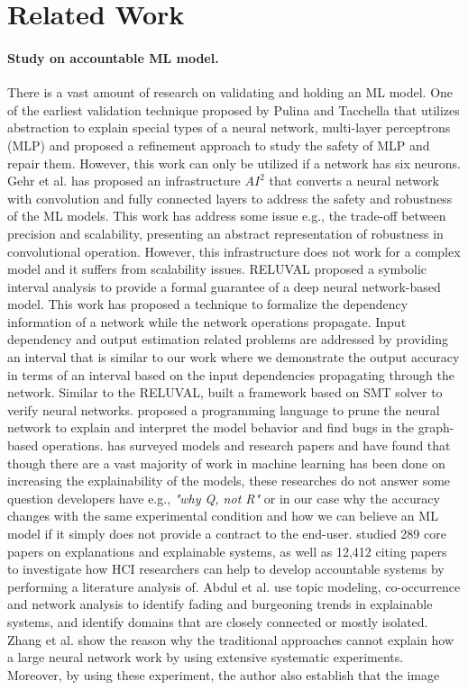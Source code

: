 \section{Related Work}
\label{sec:relatedwork}
\paragraph{\textbf{Study on accountable ML model.}}
There is a vast amount of research on validating and holding an ML model. One of the earliest validation technique proposed by Pulina and Tacchella \cite{pulina2010abstraction} that utilizes abstraction to explain special types of a neural network, multi-layer perceptrons (MLP) and proposed a refinement approach to study the safety of MLP and repair them. However, this work can only be utilized if a network has six neurons. Gehr et al. \cite{gehr2018ai2} has proposed an infrastructure $AI^{2}$ that converts a neural network with convolution and fully connected layers to address the safety and robustness of the ML models. This work has address some issue e.g., the trade-off between precision and scalability, presenting an abstract representation of robustness in convolutional operation. However, this infrastructure does not work for a complex model and it suffers from scalability issues. RELUVAL \cite{wang2018formal} proposed a symbolic interval analysis to provide a formal guarantee of a deep neural network-based model. This work has proposed a technique to formalize the dependency information of a network while the network operations propagate. Input dependency and output estimation related problems are addressed by providing an interval that is similar to our work where we demonstrate the output accuracy in terms of an interval based on the input dependencies propagating through the network. Similar to the RELUVAL, \cite{katz2017reluplex} built a framework based on SMT solver to verify neural networks. \cite{jia2019taso} proposed a programming language to prune the neural network to explain and interpret the model behavior and find bugs in the graph-based operations. \cite{du2018techniques} has surveyed models and research papers and have found that though there are a vast majority of work in machine learning has been done on increasing the explainability of the models, these researches do not answer some question developers have e.g., \emph{"why Q, not R"} or in our case why the accuracy changes with the same experimental condition and how we can believe an ML model if it simply does not provide a contract to the end-user. \cite{abdul2018trends} studied 289 core papers on explanations and explainable systems, as well as 12,412 citing papers to investigate how HCI researchers can help to develop accountable systems by performing a literature analysis of. Abdul et al. use topic modeling, co-occurrence and network analysis to identify fading and burgeoning trends in explainable systems, and identify domains that are closely connected or mostly isolated. Zhang et al. \cite{zhang2016understanding} show the reason why the traditional approaches cannot explain how a large neural network work by using extensive systematic experiments. Moreover, by using these experiment, the author also establish that  the image 